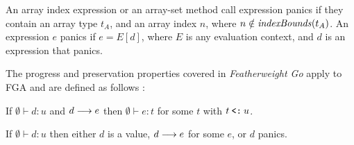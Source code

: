 An array index expression or an array-set method call expression panics if they
contain an array type $t_A$, and an array index $n$, where $n \notin
    \mathit{indexBounds}(t_A)$. An expression $e$ panics if $e = E[d]$, where $E$ is any
evaluation context, and $d$ is an expression that panics.

The progress and preservation properties covered in \emph{Featherweight Go}
apply to FGA and are defined as follows \autocite{fg}:

\begin{theorem}[Preservation]
    If\/ $\emptyset \vdash d : u$ and $d \longrightarrow e$
    then\/ $\emptyset \vdash e : t$ for some $t$
    with\/ $t \mathbin{\texttt{<:}} u$.
\end{theorem}

\begin{theorem}[Progress]
    If\/ $\emptyset \vdash d:u$ then
    either\/ $d$ is a value,
    $d \longrightarrow e$ for some $e$,
    or\/ $d$ panics.
\end{theorem}

